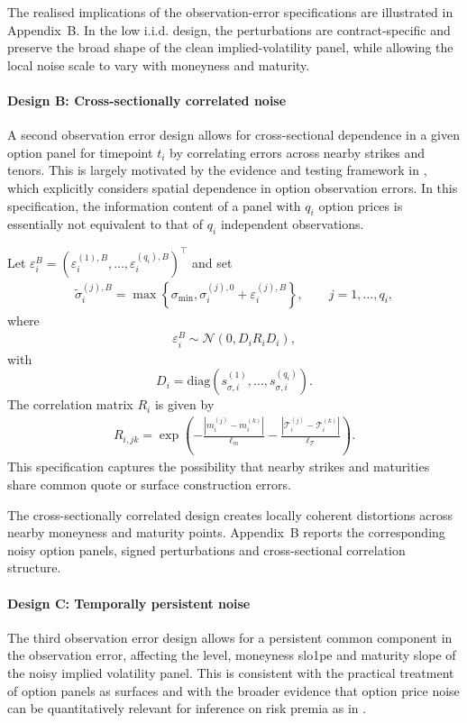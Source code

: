 \documentclass[11pt,a4paper,notitlepage]{article}
\numberwithin{equation}{section}
\begin{document}
The realised implications of the observation-error specifications are illustrated in Appendix~B. In the low i.i.d. design, the perturbations are contract-specific and preserve the broad shape of the clean implied-volatility panel, while allowing the local noise scale to vary with moneyness and maturity.

\paragraph{Design B: Cross-sectionally correlated noise}
A second observation error design allows for cross-sectional dependence in a given option panel for timepoint $t_i$ by correlating errors across nearby strikes and tenors. This is largely motivated by the evidence and testing framework in \cite{andersen2021spatial}, which explicitly considers spatial dependence in option observation errors. In this specification, the information content of a panel with $q_i$ option prices is essentially not equivalent to that of $q_i$ independent observations.

Let
$\varepsilon_i^B=\left(\varepsilon_i^{(1),B},\ldots,\varepsilon_i^{(q_i),B}\right)^\top$ and set
\begin{align}
\tilde\sigma_i^{(j),B}
=
\max\left\{
\sigma_{\min},
\sigma_i^{(j),0}
+
\varepsilon_i^{(j),B}
\right\},
\qquad
j=1,\ldots,q_i,
\label{eq:noise_spatial_iv}
\end{align}
where
\begin{align}
\varepsilon_i^B\sim\mathcal{N}(0,D_i R_i D_i),
\label{eq:noise_spatial}
\end{align}
with
\[
D_i=\mathrm{diag}\left(s_{\sigma,i}^{(1)},\ldots,s_{\sigma,i}^{(q_i)}\right).
\]
The correlation matrix $R_i$ is given by
\begin{align}
R_{i,jk}
=
\exp\left(
-\frac{|m_i^{(j)}-m_i^{(k)}|}{\ell_m}
-\frac{|\mathcal T_i^{(j)}-\mathcal T_i^{(k)}|}{\ell_{\mathcal T}}
\right).
\label{eq:spatial_kernel}
\end{align}
This specification captures the possibility that nearby strikes and maturities share common quote or surface construction errors.

The cross-sectionally correlated design creates locally coherent distortions across nearby moneyness and maturity points. Appendix~B reports the corresponding noisy option panels, signed perturbations and cross-sectional correlation structure.

\paragraph{Design C: Temporally persistent noise}
The third observation error design allows for a persistent common component in the observation error, affecting the level, moneyness slo1pe and maturity slope of the noisy implied volatility panel. This is consistent with the practical treatment of option panels as surfaces and with the broader evidence that option price noise can be quantitatively relevant for inference on risk premia as in \cite{duarte2024very}.
\end{document}
